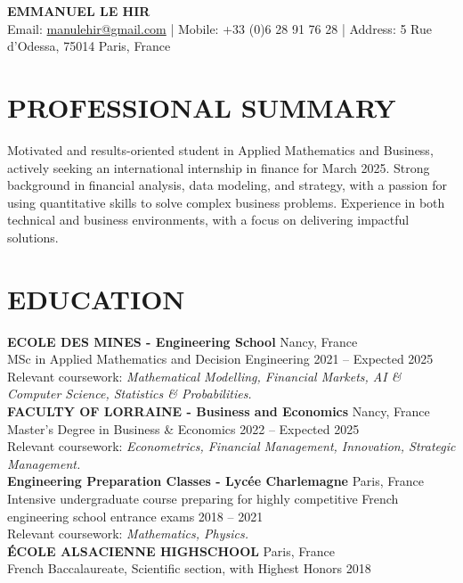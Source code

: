 \documentclass[a4paper,9pt]{extarticle}
\begin{document}
\pagestyle{empty}

\begin{center}
\textbf{\Large EMMANUEL LE HIR}\\[2pt] %
Email: \href{mailto:manulehir@gmail.com}{manulehir@gmail.com} | Mobile: +33 (0)6 28 91 76 28 | Address: 5 Rue d'Odessa, 75014 Paris, France \\
\end{center}

\section*{PROFESSIONAL SUMMARY}
Motivated and results-oriented student in Applied Mathematics and Business, actively seeking an international internship in finance for March 2025. Strong background in financial analysis, data modeling, and strategy, with a passion for using quantitative skills to solve complex business problems. Experience in both technical and business environments, with a focus on delivering impactful solutions.

\section*{EDUCATION}
\textbf{ECOLE DES MINES - Engineering School} \hfill Nancy, France\\
MSc in Applied Mathematics and Decision Engineering \hfill 2021 -- Expected 2025\\
Relevant coursework: \textit{Mathematical Modelling, Financial Markets, AI \& Computer Science, Statistics \& Probabilities.}\\[6pt]
\noindent
\textbf{FACULTY OF LORRAINE - Business and Economics} \hfill Nancy, France\\
Master’s Degree in Business \& Economics \hfill 2022 -- Expected 2025\\
Relevant coursework: \textit{Econometrics, Financial Management, Innovation, Strategic Management.}\\[6pt]
\noindent
\textbf{Engineering Preparation Classes - Lycée Charlemagne} \hfill Paris, France\\
Intensive undergraduate course preparing for highly competitive French engineering school entrance exams \hfill 2018 -- 2021\\
Relevant coursework: \textit{Mathematics, Physics.}\\[6pt]
\noindent
\textbf{ÉCOLE ALSACIENNE HIGHSCHOOL} \hfill Paris, France\\
French Baccalaureate, Scientific section, with Highest Honors \hfill 2018\\
\end{document}
